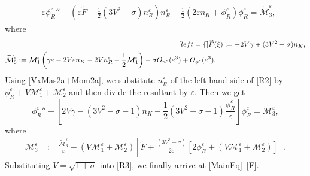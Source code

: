 \documentclass{amsart}
\newcommand{\veps}{\varepsilon}
\numberwithin{equation}{section}
\theoremstyle{plain}%
\theoremstyle{definition}
\theoremstyle{remark}
\theoremstyle{remark}
\begin{document}
\begin{equation}\label{R2}
\begin{split}
& \veps{\phi_R^{\veps}}''+ \left(\veps\widetilde{F} + \frac{1}{2}(3V^2-\sigma)n_R^\veps \right) n_R^{\veps} - \frac{1}{2}\left( 2\veps n_K + \phi_R^{\veps} \right)\phi_R^{\veps} =   \widetilde{\mathcal{M}}_3^\veps,
\end{split}
\end{equation}
where
\begin{subequations}
\begin{align}[left = \empheqlbrace\,]
 \widetilde{F}(\xi)
& :=-2V\gamma +(3V^2-\sigma) n_K , \label{F3} \\
 \begin{split}
\widetilde{\mathcal{M}}_3^\veps
& :=  \mathcal{M}_1^\veps \left( \gamma\veps-2V\veps n_K-2Vn_R^\veps-\frac{1}{2}\mathcal{M}_1^\veps \right) -\sigma O_{n^\veps}(\veps^3) + O_{\phi^\veps}(\veps^3).
\end{split}
 \label{M3}
\end{align}
\end{subequations}
Using \eqref{VxMas2a+Mom2a}, we substitute $n_R^{\veps}$ of the left-hand side of \eqref{R2} by $\phi_R^{\veps} + V\mathcal{M}_1^\veps + \mathcal{M}_2^\veps$ and then divide the resultant by $\veps$.  Then we get
\begin{equation}\label{R3}
{\phi_R^{\veps}}''  -\left[2V\gamma - (3V^2-\sigma-1)n_K - \frac{1}{2}(3V^2-\sigma-1)\frac{\phi_R^\veps}{\veps}\right]\phi_R^\veps = \mathcal{M}_3^\veps,
\end{equation}
where 
\begin{equation}\label{M3Def}
\begin{split} 
 \mathcal{M}_3^\veps
&:=   \frac{\widetilde{\mathcal{M}}_3^\veps}{\veps} - \left(V\mathcal{M}_1^\veps + \mathcal{M}_2^\veps\right) \left[ \widetilde{F}  + \frac{(3V^2-\sigma)}{2\veps}\left[2\phi_R^\veps + \left(V\mathcal{M}_1^\veps + \mathcal{M}_2^\veps\right) \right] \right].
\end{split}
\end{equation}
Substituting $V=\sqrt{1+\sigma}$ into \eqref{R3}, we finally arrive at  \eqref{MainEq}--\eqref{F}.
\end{document}
